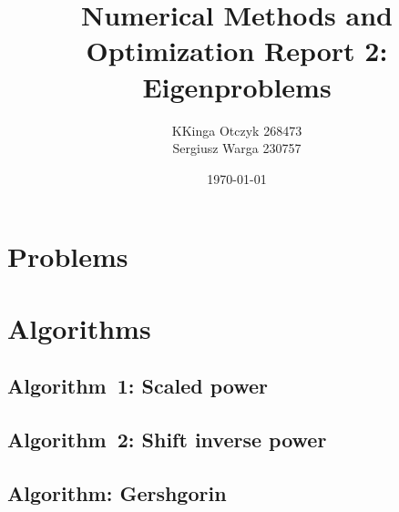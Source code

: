 \documentclass[a4paper]{article}
\title{Numerical Methods and Optimization Report 2: Eigenproblems}
\author{KKinga Otczyk 268473\\Sergiusz Warga 230757}
\date{\today}
\begin{document}
\maketitle
\tableofcontents
\pagebreak

\section{Problems}





\clearpage

\section{Algorithms}
\subsection{Algorithm~1: Scaled power}%
\label{algorithm:1}

\subsection{Algorithm~2: Shift inverse power}%
\label{algorithm:2}

\subsection{Algorithm: Gershgorin}%
\label{algorithm:gershgorin}



\clearpage

\nocite{GoluVanl96,Zarowski,Zdunek}


\end{document}
